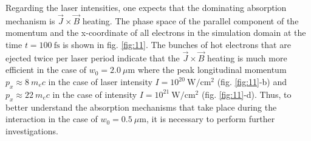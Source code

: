 Regarding the laser intensities, one expects that the dominating absorption mechanism is $ \vec{J} \times \vec{B} $ heating. The phase space of the parallel component of the momentum and the x-coordinate of all electrons in the simulation domain at the time $ t = 100 \ \mathrm{fs} $ is shown in fig. \ref{fig:11}. The bunches of hot electrons that are ejected twice per laser period indicate that the $ \vec{J} \times \vec{B} $ heating is much more efficient in the case of $ w_0 = 2.0 \ \mu\mathrm{m} $ where the peak longitudinal momentum $ p_x \approx 8 \ m_{e} c $ in the case of laser intensity $ I = 10^{20} \ \mathrm{W/cm^2} $ (fig. \ref{fig:11}-b) and $ p_x \approx 22 \ m_{e} c $ in the case of intensity $ I = 10^{21} \ \mathrm{W/cm^2} $ (fig. \ref{fig:11}-d). Thus, to better understand the absorption mechanisms that take place during the interaction in the case of $ w_0 = 0.5 \ \mu\mathrm{m} $, it is necessary to perform further investigations.

